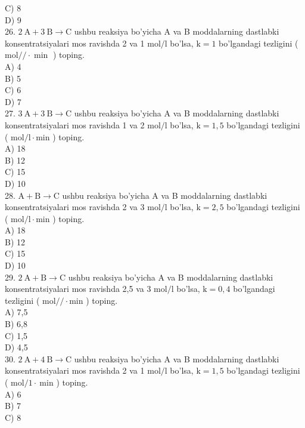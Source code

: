C) 8\\
D) 9\\
26. $2 \mathrm{~A}+3 \mathrm{~B} \rightarrow \mathrm{C}$ ushbu reaksiya bo'yicha A va B moddalarning dastlabki\\
konsentratsiyalari mos ravishda 2 va 1 $\mathrm{mol} / \mathrm{l}$ bo'lsa, $\mathrm{k}=1$ bo'lgandagi tezligini ( $\mathrm{mol} / / \cdot \min$ ) toping.\\
A) 4\\
B) 5\\
C) 6\\
D) 7\\
27. $3 \mathrm{~A}+3 \mathrm{~B} \rightarrow \mathrm{C}$ ushbu reaksiya bo'yicha A va B moddalarning dastlabki konsentratsiyalari mos ravishda 1 va 2 $\mathrm{mol} / \mathrm{l}$ bo'lsa, $\mathrm{k}=1,5$ bo'lgandagi tezligini ( $\mathrm{mol} / \mathrm{l} \cdot \mathrm{min}$ ) toping.\\
A) 18\\
B) 12\\
C) 15\\
D) 10\\
28. $\mathrm{A}+\mathrm{B} \rightarrow \mathrm{C}$ ushbu reaksiya bo'yicha A va B moddalarning dastlabki konsentratsiyalari mos ravishda 2 va 3 $\mathrm{mol} / \mathrm{l}$ bo'lsa, $\mathrm{k}=2,5$ bo'lgandagi tezligini ( $\mathrm{mol} / \mathrm{l} \cdot \mathrm{min}$ ) toping.\\
A) 18\\
B) 12\\
C) 15\\
D) 10\\
29. $2 \mathrm{~A}+\mathrm{B} \rightarrow \mathrm{C}$ ushbu reaksiya bo'yicha A va B moddalarning dastlabki konsentratsiyalari mos ravishda 2,5 va 3 $\mathrm{mol} / \mathrm{l}$ bo'lsa, $\mathrm{k}=0,4$ bo'lgandagi tezligini ( $\mathrm{mol} / / \cdot \mathrm{min}$ ) toping.\\
A) 7,5\\
B) 6,8\\
C) 1,5\\
D) 4,5\\
30. $2 \mathrm{~A}+4 \mathrm{~B} \rightarrow \mathrm{C}$ ushbu reaksiya bo'yicha A va B moddalarning dastlabki konsentratsiyalari mos ravishda 2 va 1 $\mathrm{mol} / \mathrm{l}$ bo'lsa, $\mathrm{k}=1,5$ bo'lgandagi tezligini ( $\mathrm{mol} / 1 \cdot \mathrm{~min}$ ) toping.\\
A) 6\\
B) 7\\
C) 8\\
